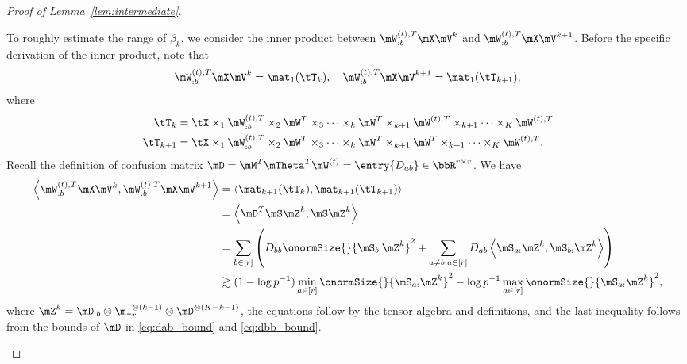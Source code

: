 \documentclass[lettersize,onecolumn,journal]{IEEEtran}
\theoremstyle{definition}
\theoremstyle{definition}
\newcommand{\of}[1]{\left(#1\right)}
\newcommand{\ang}[1]{\left\langle#1\right\rangle}
\begin{document}
\begin{proof}[Proof of Lemma~\ref{lem:intermediate}]
\begin{enumerate}[wide]
    To roughly estimate the range of $\beta_k$, we consider the inner product between $\mW_{:b}^{(t),T} \mX \mV^k$ and $\mW_{:b}^{(t),T} \mX \mV^{k+1}$. Before the specific derivation of the inner product, note that 
    \begin{equation}
        \mW_{:b}^{(t),T} \mX \mV^k = \mat_1(\tT_k), \quad  \mW_{:b}^{(t),T} \mX \mV^{k+1} = \mat_1(\tT_{k+1}),
    \end{equation}
    where 
    \begin{align}
        \tT_k &= \tX \times_1  \mW_{:b}^{(t),T} \times_2 \mW^T \times_3 \cdots \times_k \mW^T \times_{k+1} \mW^{(t),T} \times_{k+1} \cdots \times_K \mW^{(t),T}\\
        \tT_{k+1} &= \tX \times_1  \mW_{:b}^{(t),T} \times_2 \mW^T \times_3 \cdots \times_k \mW^T \times_{k+1} \mW^{T} \times_{k+1} \cdots \times_K \mW^{(t),T}. 
    \end{align}
    Recall the definition of confusion matrix $\mD = \mM^T \mTheta^T \mW^{(t)} = \entry{D_{ab}} \in \bbR^{r \times r}$.
 We have 
    \begin{align}
         \ang{\mW_{:b}^{(t),T} \mX \mV^k , \mW_{:b}^{(t),T} \mX \mV^{k+1}} 
         &  =\ang{ \mat_{k+1}(\tT_k), \mat_{k+1}(\tT_{k+1}) } \label{eq:j11_tensormat} \\
  & =  \ang{ \mD^T \mS \mZ^k ,  \mS \mZ^k   }\\
         & = \sum_{b \in [r]} \of{ D_{bb} \onormSize{}{\mS_{b:}\mZ^k}^2 + \sum_{a \neq b, a \in [r]} D_{ab} \ang{\mS_{a:} \mZ^k, \mS_{b:} \mZ^k}} \\
         & \gtrsim (1 - \log p^{-1}) \min_{a \in [r]}\onormSize{}{\mS_{a:}\mZ^k}^2 - \log p^{-1} \max_{a \in [r]} \onormSize{}{\mS_{a:}\mZ^k}^2, \label{eq:j11inner}
    \end{align}
    where $\mZ^k = \mD_{:b} \otimes \mI_r^{\otimes (k-1)} \otimes  \mD^{\otimes (K-k-1)}$, the equations follow by the tensor algebra and definitions, and the last inequality follows from the bounds of $\mD$ in \eqref{eq:dab_bound} and \eqref{eq:dbb_bound}. 
    

\end{enumerate}
\end{proof}
\end{document}
